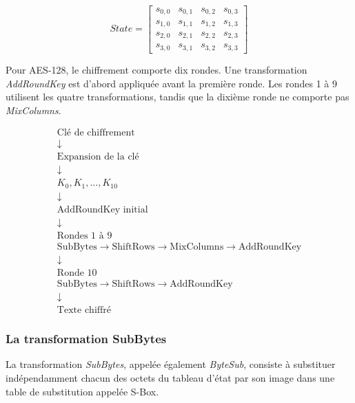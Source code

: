 \documentclass[12pt,a4paper]{article}
\begin{document}
\[
State=
\begin{bmatrix}
s_{0,0}&s_{0,1}&s_{0,2}&s_{0,3}\\
s_{1,0}&s_{1,1}&s_{1,2}&s_{1,3}\\
s_{2,0}&s_{2,1}&s_{2,2}&s_{2,3}\\
s_{3,0}&s_{3,1}&s_{3,2}&s_{3,3}
\end{bmatrix}
\]

Pour AES-128, le chiffrement comporte dix rondes. Une transformation
\textit{AddRoundKey} est d'abord appliquée avant la première ronde.
Les rondes 1 à 9 utilisent les quatre transformations, tandis que
la dixième ronde ne comporte pas \textit{MixColumns}.

\begin{center}
\[
\boxed{
\begin{array}{c}
\text{Clé de chiffrement}\\
\downarrow\\
\text{Expansion de la clé}\\
\downarrow\\
K_0,K_1,\ldots,K_{10}\\[0.2cm]
\downarrow\\
\text{AddRoundKey initial}\\
\downarrow\\
\text{Rondes 1 à 9}\\
\text{SubBytes}
\rightarrow
\text{ShiftRows}
\rightarrow
\text{MixColumns}
\rightarrow
\text{AddRoundKey}\\
\downarrow\\
\text{Ronde 10}\\
\text{SubBytes}
\rightarrow
\text{ShiftRows}
\rightarrow
\text{AddRoundKey}\\
\downarrow\\
\text{Texte chiffré}
\end{array}}
\]
\end{center}



\subsubsection{La transformation SubBytes}

La transformation \textit{SubBytes}, appelée également
\textit{ByteSub}, consiste à substituer indépendamment chacun des
octets du tableau d'état par son image dans une table de substitution
appelée S-Box.
\end{document}
